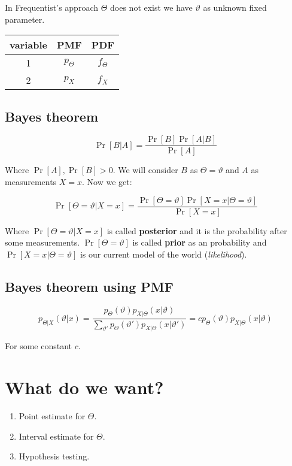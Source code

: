 \begin{rem}
	In Frequentist's approach $\Theta$ does not exist we have $\vartheta$ as unknown fixed parameter.
\end{rem}

\begin{table}\centering
	\begin{tabular}{| c | c | c |}
		variable & PMF          & PDF          \\
		\hline
		1 & $p_{\Theta}$ & $f_{\Theta}$ \\
		2 & $p_{X}$ & $f_{X}$ \\
	\end{tabular}
\end{table}

\subsection{Bayes theorem}

$$
\Pr[B \vert A] = \frac{\Pr[B] \Pr[A \vert B]}{\Pr[A]}
$$

Where $\Pr[A], \Pr[B] > 0$. We will consider $B$ as $\Theta = \vartheta$ and $A$ as measurements $X = x$. Now we get:

$$
\Pr[\Theta = \vartheta \vert X = x] = \frac{\Pr[\Theta = \vartheta] \Pr[X = x \vert \Theta = \vartheta]}{\Pr[X = x]}
$$

Where $\Pr[\Theta = \vartheta \vert X = x]$ is called \textbf{posterior} and it is the probability after some measurements. $\Pr[\Theta = \vartheta]$ is called \textbf{prior} as an probability and $\Pr[X = x \vert \Theta = \vartheta]$ is our current model of the world (\textit{likelihood}).

\subsection{Bayes theorem using PMF}

$$
p_{\Theta\vert X} (\vartheta \vert x) = \frac{p_{\Theta}(\vartheta) p_{X\vert\Theta}(x \vert \vartheta)}{\sum_{\vartheta'} p_{\Theta}(\vartheta')p_{X\vert\Theta}(x \vert \vartheta')} = c p_{\Theta}(\vartheta) p_{X \vert \Theta}(x \vert \vartheta)
$$

For some constant $c$.

\section{What do we want?}

\begin{enumerate}
	\item Point estimate for $\Theta$.
	\item Interval estimate for $\Theta$.
	\item Hypothesis testing.
\end{enumerate}

